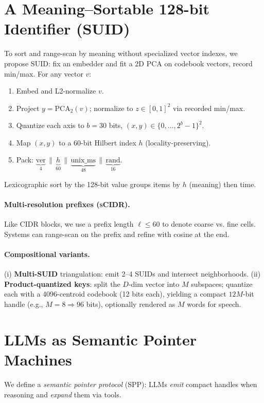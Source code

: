 \documentclass[11pt]{article}
\newcommand{\suid}{\textsc{SUID}}
\newcommand{\scidr}{\textsc{sCIDR}}
\begin{document}
\section{A Meaning--Sortable 128-bit Identifier (\suid)}
\label{sec:suid}
To sort and range-scan by meaning without specialized vector indexes, we propose \suid: fix an embedder and fit a 2D PCA on codebook vectors, record min/max. For any vector $v$:
\begin{enumerate}[leftmargin=2em]
  \item Embed and L2-normalize $v$.
  \item Project $y=\text{PCA}_2(v)$; normalize to $z\in[0,1]^2$ via recorded min/max.
  \item Quantize each axis to $b{=}30$ bits, $(x,y)\in\{0,\dots,2^b{-}1\}^2$.
  \item Map $(x,y)$ to a 60-bit Hilbert index $h$ (locality-preserving).
  \item Pack: $\underbrace{\text{ver}}_{4}\,\|\,\underbrace{h}_{60}\,\|\,\underbrace{\text{unix\_ms}}_{48}\,\|\,\underbrace{\text{rand}}_{16}$.
\end{enumerate}
Lexicographic sort by the 128-bit value groups items by $h$ (meaning) then time.

\paragraph{Multi-resolution prefixes (\scidr).} Like CIDR blocks, we use a prefix length $\ell\!\le\!60$ to denote coarse vs. fine cells. Systems can range-scan on the prefix and refine with cosine at the end.

\paragraph{Compositional variants.} (i) \textbf{Multi-\suid} triangulation: emit 2--4 \suid s and intersect neighborhoods. (ii) \textbf{Product-quantized keys}: split the $D$-dim vector into $M$ subspaces; quantize each with a 4096-centroid codebook (12 bits each), yielding a compact $12M$-bit handle (e.g., $M{=}8\Rightarrow 96$ bits), optionally rendered as $M$ words for speech.

\section{LLMs as Semantic Pointer Machines}
\label{sec:llm}
We define a \emph{semantic pointer protocol} (SPP): LLMs \emph{emit} compact handles when reasoning and \emph{expand} them via tools.
\end{document}
